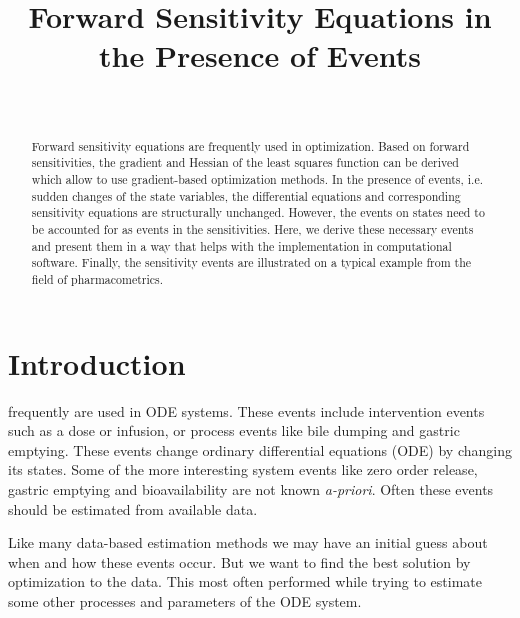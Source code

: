 \documentclass[journal, a4paper]{IEEEtran}
\begin{document}
	\title{Forward Sensitivity Equations in the Presence of Events}

\author{
    \\
}


	\maketitle

\begin{abstract}
	Forward sensitivity equations are frequently used in optimization. Based on forward sensitivities, the gradient and Hessian of the least squares function can be derived which allow to use gradient-based optimization methods. In the presence of events, i.e. sudden changes of the state variables, the differential equations and corresponding sensitivity equations are structurally unchanged. However, the events on states need to be accounted for as events in the sensitivities. Here, we derive these necessary events and present them in a way that helps with the implementation in computational software. Finally, the sensitivity events are illustrated on a typical example from the field of pharmacometrics.
\end{abstract}

\section{Introduction}
	 frequently are used in ODE systems.  These
	events include intervention events such as a dose
	or infusion, or process events like bile 
	dumping and gastric emptying.  These events change ordinary 
	differential equations (ODE) by changing its states.  Some of 
	the more interesting system events like zero order release, gastric 
	emptying and bioavailability are not known \emph{a-priori}.  Often these 
	events should be estimated from available data.
	
	Like many data-based estimation methods we may have an initial guess about
	when and how these events occur.  But we want to find the best solution
	by optimization to the data. This most often performed while trying to
	estimate some other processes and parameters of the ODE system. 
	
\end{document}
